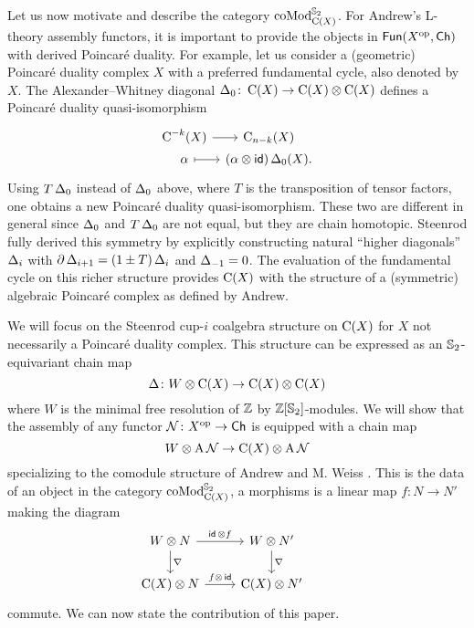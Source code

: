 Let us now motivate and describe the category $\operatorname{coMod}^{\mathbb{S}_2}_{\operatorname{C}(X)}$.
For Andrew's L-theory assembly functors, it is important to provide the objects in $\mathsf{Fun}(X^{\mathrm{op}}, \mathsf{Ch})$ with derived Poincar\'e duality.
For example, let us consider a (geometric) Poincar\'e duality complex $X$ with a preferred fundamental cycle, also denoted by $X$.
The Alexander--Whitney diagonal $\operatorname{\Delta}_0 \colon \operatorname{C}(X) \to \operatorname{C}(X) \otimes \operatorname{C}(X)$ defines a Poincar\'e duality quasi-isomorphism
\[
\begin{tikzcd}[column sep=tiny,row sep=0]
	\cochains^{-k}(X) \arrow[r] & \chains_{n-k}(X) \\
	\alpha \arrow[r,mapsto] & (\alpha \ot \id)\copr_0(X).
\end{tikzcd}
\]
Using $T\operatorname{\Delta}_0$ instead of $\operatorname{\Delta}_0$ above, where $T$ is the transposition of tensor factors, one obtains a new Poincar\'e duality quasi-isomorphism.
These two are different in general since $\operatorname{\Delta}_0$ and $T\operatorname{\Delta}_0$ are not equal, but they are chain homotopic.
Steenrod \cite{steenrod1947products} fully derived this symmetry by explicitly constructing natural ``higher diagonals'' $\operatorname{\Delta}_i$ with $\partial \operatorname{\Delta}_{i+1} = (1 \pm T) \operatorname{\Delta}_i$ and $\operatorname{\Delta}_{-1} = 0$.
The evaluation of the fundamental cycle on this richer structure provides $\operatorname{C}(X)$ with the structure of a (symmetric) algebraic Poincar\'e complex as defined by Andrew.

We will focus on the Steenrod cup-$i$ coalgebra structure on $\operatorname{C}(X)$ for $X$ not necessarily a Poincar\'e duality complex.
This structure can be expressed as an $\mathbb{S}_2$-equivariant chain map
\[
\operatorname{\Delta} \colon W \otimes \operatorname{C}(X) \to \operatorname{C}(X) \otimes \operatorname{C}(X)
\]
where $W$ is the minimal free resolution of $\mathbb{Z}$ by $\mathbb{Z}[\mathbb{S}_2]$-modules.
We will show that the assembly of any functor $\mathcal{N} \colon X^{\mathrm{op}} \to \mathsf{Ch}$ is equipped with a chain map
\[
W \otimes \operatorname{A} \mathcal{N} \to \operatorname{C}(X) \otimes \operatorname{A} \mathcal{N}
\]
specializing to the comodule structure of Andrew and M. Weiss \cite[Proposition~5.3]{ranicki1990assembly}.
This is the data of an object in the category $\operatorname{coMod}^{\mathbb{S}_2}_{\operatorname{C}(X)}$, a morphisms is a linear map $f \colon N \to N'$ making the diagram
\[
\begin{tikzcd}
	W \ot N \arrow[d, "\nabla"] \arrow[r, "\id\, \ot f"] &
	W \ot N' \arrow[d, "\nabla"] & \\
	\chains(X) \ot N \arrow[r, "f \ot\, \id"] &
	\chains(X) \ot N'
\end{tikzcd}
\]
commute.
We can now state the contribution of this paper.

